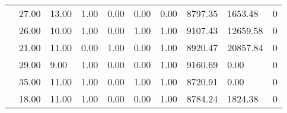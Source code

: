 \begin{table*}[h]
\begin{tabular}{llllllllll}
\multicolumn{1}{l|}{}                   & \multicolumn{1}{l|}{27.00}        & \multicolumn{1}{l|}{13.00}              & \multicolumn{1}{l|}{1.00}           & \multicolumn{1}{l|}{0.00}              & \multicolumn{1}{l|}{0.00}             & \multicolumn{1}{l|}{0.00}              & \multicolumn{1}{l|}{8797.35}       & \multicolumn{1}{l|}{1653.48}       & \multicolumn{1}{l|}{0}          \\ \cline{2-10} 
\multicolumn{1}{l|}{}                   & \multicolumn{1}{l|}{26.00}        & \multicolumn{1}{l|}{10.00}              & \multicolumn{1}{l|}{1.00}           & \multicolumn{1}{l|}{0.00}              & \multicolumn{1}{l|}{1.00}             & \multicolumn{1}{l|}{1.00}              & \multicolumn{1}{l|}{9107.43}       & \multicolumn{1}{l|}{12659.58}      & \multicolumn{1}{l|}{0}          \\ \cline{2-10} 
\multicolumn{1}{l|}{}                   & \multicolumn{1}{l|}{21.00}        & \multicolumn{1}{l|}{11.00}              & \multicolumn{1}{l|}{0.00}           & \multicolumn{1}{l|}{1.00}              & \multicolumn{1}{l|}{0.00}             & \multicolumn{1}{l|}{1.00}              & \multicolumn{1}{l|}{8920.47}       & \multicolumn{1}{l|}{20857.84}      & \multicolumn{1}{l|}{0}          \\ \cline{2-10} 
\multicolumn{1}{l|}{}                   & \multicolumn{1}{l|}{29.00}        & \multicolumn{1}{l|}{9.00}               & \multicolumn{1}{l|}{1.00}           & \multicolumn{1}{l|}{0.00}              & \multicolumn{1}{l|}{0.00}             & \multicolumn{1}{l|}{1.00}              & \multicolumn{1}{l|}{9160.69}       & \multicolumn{1}{l|}{0.00}          & \multicolumn{1}{l|}{0}          \\ \cline{2-10} 
\multicolumn{1}{l|}{}                   & \multicolumn{1}{l|}{35.00}        & \multicolumn{1}{l|}{11.00}              & \multicolumn{1}{l|}{1.00}           & \multicolumn{1}{l|}{0.00}              & \multicolumn{1}{l|}{1.00}             & \multicolumn{1}{l|}{1.00}              & \multicolumn{1}{l|}{8720.91}       & \multicolumn{1}{l|}{0.00}          & \multicolumn{1}{l|}{0}          \\ \cline{2-10} 
\multicolumn{1}{l|}{}                   & \multicolumn{1}{l|}{18.00}        & \multicolumn{1}{l|}{11.00}              & \multicolumn{1}{l|}{1.00}           & \multicolumn{1}{l|}{0.00}              & \multicolumn{1}{l|}{0.00}             & \multicolumn{1}{l|}{1.00}              & \multicolumn{1}{l|}{8784.24}       & \multicolumn{1}{l|}{1824.38}       & \multicolumn{1}{l|}{0}          \\ \cline{2-10} 

\end{tabular}
\end{table*}

